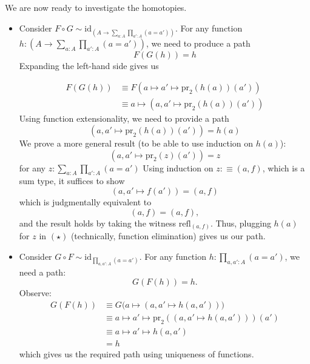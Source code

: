 \documentclass[14pt]{extarticle}
\newcommand{\0}{{\mathbf 0}}
\newcommand{\1}{{\mathbf 1}}
\newcommand{\2}{{\mathbf 2}}
\newcommand{\mt}{\mapsto}
\newcommand{\refl}{\mathrm{refl}}
\newcommand{\pr}{\mathrm{pr}}
\newcommand{\id}{\mathrm{id}}
\begin{document}
We are now ready to investigate the homotopies.

\begin{itemize}
\item Consider $F \circ G \sim \id_{\left(A \to \sum_{a:A}\prod_{a':A}(a=a')\right)}$. For any function $h : \left(A \to \sum_{a:A}\prod_{a':A}(a=a')\right)$, we need to produce a path
\[F(G(h)) = h\]
Expanding the left-hand side gives us

\begin{align*}
F(G(h)) &\equiv F(a \mt a' \mt \pr_2(h(a))(a')) \\
&\equiv a \mt (a, a' \mt \pr_2(h(a))(a'))
\end{align*}
Using function extensionality, we need to provide a path
\[(a, a' \mt \pr_2(h(a))(a')) = h(a)\]
We prove a more general result (to be able to use induction on $h(a)$):
\[(a, a' \mt \pr_2(z)(a')) = z \tag{$\star$}\] for any $z : \sum_{a:A}\prod_{a':A} (a = a')$
Using induction on $z :\equiv (a,f)$, which is a sum type, it suffices to show
\[(a, a' \mt f(a')) = (a,f)\] which is judgmentally equivalent to 
\[(a, f) = (a,f),\] and the result holds by taking the witness $\refl_{(a,f)}$. Thus, plugging $h(a)$ for $z$ in $(\star)$ (technically, function elimination) gives us our path.

\item Consider $G \circ F \sim \id_{\prod_{a,a':A}(a=a')}$. For any function $h : \prod_{a,a':A}(a = a')$, we need a path: \[G(F(h)) = h.\] Observe:
\begin{align*}
G(F(h)) &\equiv G\Big(a \mt (a, a' \mt h(a,a'))\Big) \\
&\equiv a \mt a' \mt \pr_2((a,a' \mt h(a,a')))(a') \\
&\equiv a \mt a' \mt h(a,a') \\
&= h
\end{align*}
which gives us the required path using uniqueness of functions.
\end{itemize}
\end{document}
